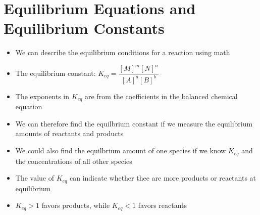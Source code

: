\documentclass[12pt, openany, letterpaper]{memoir}
\begin{document}
\section{Equilibrium Equations and Equilibrium Constants}
\begin{itemize}
	\item We can describe the equilibrium conditions for a reaction using math
	\item The equilibrium constant: $K_{eq}=\dfrac{[M]^m[N]^n}{[A]^a[B]^b}$
	\item The exponents in $K_{eq}$ are from the coefficients in the balanced chemical equation
	\item We can therefore find the equilbrium constant if we measure the equilibrium amounts of reactants and products
	\item We could also find the equilbrium amount of one species if we know $K_{eq}$ and the concentrations of all other species
	\item The value of $K_{eq}$ can indicate whether thee are more products or reactants at equilibrium
	\item $K_{eq}>1$ favors products, while $K_{eq}<1$ favors reactants
\end{itemize}
\end{document}
